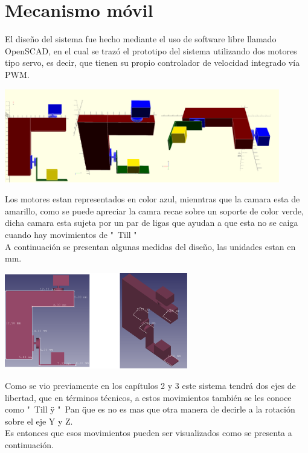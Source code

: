 \section{Mecanismo móvil}
El diseño del sistema fue hecho mediante el uso de software libre llamado OpenSCAD, en el cual se trazó el prototipo del
sistema utilizando dos motores tipo servo, es decir, que tienen su propio controlador de velocidad integrado vía PWM.
\begin{center}
	\includegraphics[width=0.9\textwidth]{Contenido/Cuerpo/Capitulo5/Fig14.eps}
	\label{Fig1}
\end{center}
Los motores estan representados en color azul, mienntras que la camara esta de amarillo, como se puede apreciar
la camra recae sobre un soporte de color verde, dicha camara esta sujeta por un par de ligas que ayudan a que esta no se
caiga cuando hay movimientos de "\ Till "\.\\
A continuación se presentan algunas medidas del diseño, las unidades estan en mm.
\begin{center}
	\includegraphics[width=0.6\textwidth]{Contenido/Cuerpo/Capitulo5/Fig16.eps}
	\label{Fig1}
\end{center}
Como se vio previamente en los capítulos 2 y 3 este sistema tendrá dos ejes de libertad, que en términos técnicos, a estos
movimientos también se les conoce como "\ Till \" y "\ Pan \" que es no es mas que otra manera de decirle a la rotación
sobre el eje Y y Z.\\
Es entonces que esos movimientos pueden ser visualizados como se presenta a continuación.
